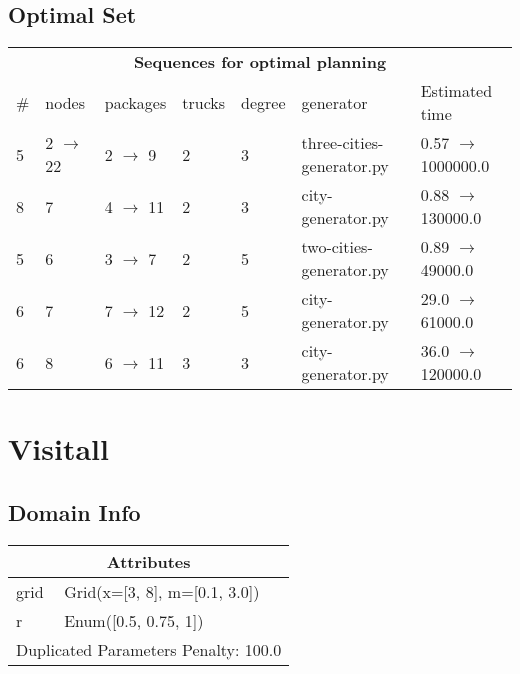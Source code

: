 \documentclass{article}
\begin{document}
                            \subsection*{Optimal Set}

                            \begin{center}
                            \begin{tabular}{l|l|l|l|l|l|l}
                            \multicolumn{7}{c}{\bf \large Sequences for optimal planning}\\
                            \# & nodes & packages & trucks & degree & generator & Estimated time\\\midrule
                            5&2 $\rightarrow$ 22&2 $\rightarrow$ 9&2&3&three-cities-generator.py&0.57 $\rightarrow$ 1000000.0\\
8&7&4 $\rightarrow$ 11&2&3&city-generator.py&0.88 $\rightarrow$ 130000.0\\
5&6&3 $\rightarrow$ 7&2&5&two-cities-generator.py&0.89 $\rightarrow$ 49000.0\\
6&7&7 $\rightarrow$ 12&2&5&city-generator.py&29.0 $\rightarrow$ 61000.0\\
6&8&6 $\rightarrow$ 11&3&3&city-generator.py&36.0 $\rightarrow$ 120000.0
                            \end{tabular}
                            \end{center}
                    \newpage \section{Visitall}
                    \subsection*{Domain Info}

                    \begin{center}
                    \begin{tabular}{p{}p{}}
                    \multicolumn{2}{c}{\bf \large Attributes}\\\midrule
                    grid & Grid(x=[3, 8], m=[0.1, 3.0])\\
r & Enum([0.5, 0.75, 1])
                    
                     \\\midrule
                    \multicolumn{2}{l}{Duplicated Parameters Penalty: 100.0}
                    \end{tabular}
                    \end{center}
                
\end{document}
